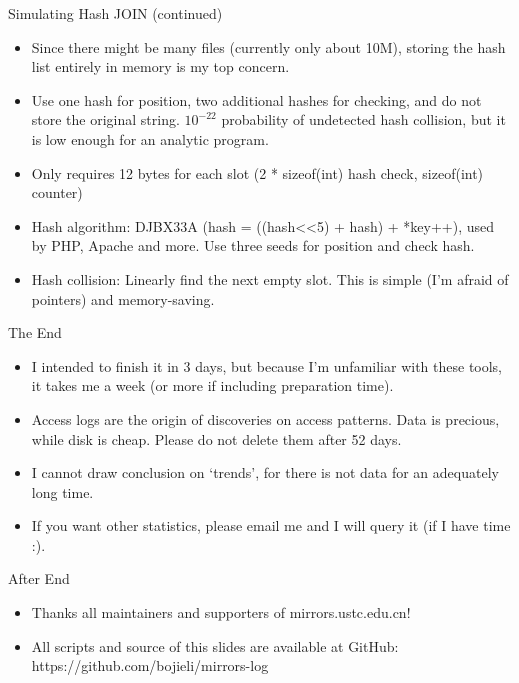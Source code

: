 \documentclass{beamer}
\begin{document}
\begin{frame}{Simulating Hash JOIN (continued)}
\begin{itemize}
  \item Since there might be many files (currently only about 10M), storing the hash list entirely in memory is my top concern.
  \item Use one hash for position, two additional hashes for checking, and do not store the original string. $10^{-22}$ probability of undetected hash collision, but it is low enough for an analytic program.
  \item Only requires 12 bytes for each slot (2 * sizeof(int) hash check, sizeof(int) counter)
  \item Hash algorithm: DJBX33A (hash = ((hash<<5) + hash) + *key++), used by PHP, Apache and more. Use three seeds for position and check hash.
  \item Hash collision: Linearly find the next empty slot. This is simple (I'm afraid of pointers) and memory-saving.
\end{itemize}
\end{frame}

\begin{frame}{The End}
\begin{itemize}
  \item I intended to finish it in 3 days, but because I'm unfamiliar with these tools, it takes me a week (or more if including preparation time).
  \item Access logs are the origin of discoveries on access patterns. Data is precious, while disk is cheap. Please do not delete them after 52 days.
  \item I cannot draw conclusion on `trends', for there is not data for an adequately long time.
  \item If you want other statistics, please email me and I will query it (if I have time :).
\end{itemize}
\end{frame}

\begin{frame}{After End}
\begin{itemize}
  \item Thanks all maintainers and supporters of mirrors.ustc.edu.cn!
  \item All scripts and source of this slides are available at GitHub: https://github.com/bojieli/mirrors-log
\end{itemize}
\end{frame}
\end{document}
